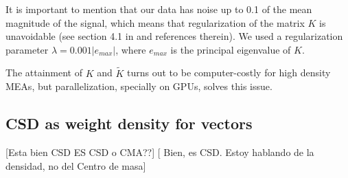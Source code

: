 \documentclass[letterpaper,12pts]{article}
\newcommand{\komment}[1]{{\color{red} [#1]}}
\newcommand{\romment}[1]{{\color{blue} [#1]}}
\begin{document}
It is important to mention that our data has noise up to 0.1 of the mean magnitude of the
signal, which means that regularization of the matrix $K$ is unavoidable (see section 4.1 in \cite{Potworowski2011} and references therein). We used a regularization parameter $\lambda=0.001 |e_{max}|$, where $e_{max}$ is the principal eigenvalue of $K$. 

The attainment of $K$ and $\tilde{K}$ turns out to be computer-costly for high density MEAs, but parallelization, specially on GPUs, solves this issue.


\subsection{CSD as weight density for vectors}
\romment{Esta bien CSD ES CSD o CMA??}
\komment{  Bien, es CSD. Estoy hablando de la densidad, no del Centro de masa}
\end{document}
